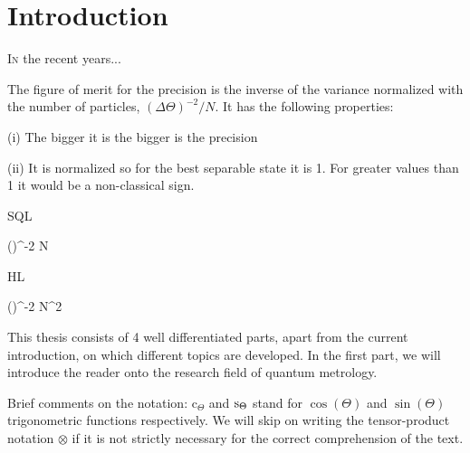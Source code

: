 \section{Introduction}


\lettrine[lines=2, findent=3pt,nindent=0pt]{I}{n} the recent years...

The figure of merit for the precision is the inverse of the variance normalized with the number of particles, $(\Delta \Theta)^{-2}/N$. It has the following properties:

(i) The bigger it is the bigger is the precision

(ii) It is normalized so for the best separable state it is 1.
For greater values than 1 it would be a non-classical sign.

SQL

\be
  (\Delta \Theta)^{-2} \le N
\ee

HL

\be
  (\Delta \Theta)^{-2} \le N^2
\ee

This thesis consists of 4 well differentiated parts, apart from the current introduction, on which different topics are developed.
In the first part, we will introduce the reader onto the research field of quantum metrology.

Brief comments on the notation: $\text{c}_{\Theta}$ and ${\rm s}_{\Theta}$ stand for $\cos(\Theta)$ and $\sin(\Theta)$ trigonometric functions respectively.
We will skip on writing the tensor-product notation $\otimes$ if it is not strictly necessary for the correct comprehension of the text.
